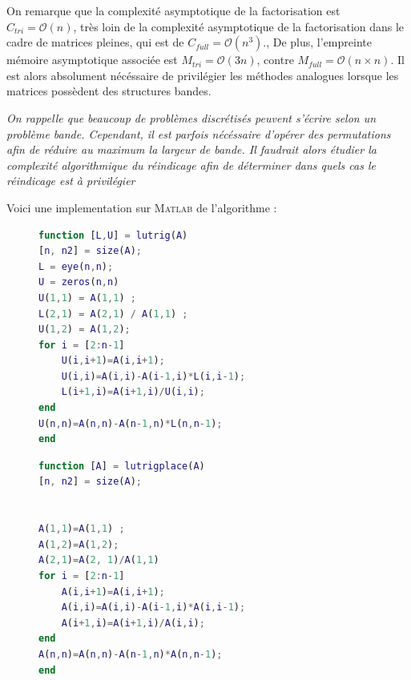 \documentclass[12pt]{report}
\begin{document}
On remarque que la complexité asymptotique de la factorisation est $C_{tri} = \mathcal{O}(n)$, très loin de la complexité asymptotique de la factorisation dans le cadre de matrices pleines, qui est de $C_{full} = \mathcal{O}(n^3)$., De plus, l'empreinte mémoire asymptotique associée est $M_{tri} = \mathcal{O}(3n)$, contre $M_{full} = \mathcal{O}(n\times n)$. Il est alors absolument nécéssaire de privilégier les méthodes analogues lorsque les matrices possèdent des structures bandes. 

\textit{On rappelle que beaucoup de problèmes discrétisés peuvent s'écrire selon un problème bande. Cependant, il est parfois nécéssaire d'opérer des permutations afin de réduire au maximum la largeur de bande. Il faudrait alors étudier la complexité algorithmique du réindicage afin de déterminer dans quels cas le réindicage est à privilégier}

Voici une implementation sur \textsc{Matlab} de l'algorithme : 


\begin{figure}[H]
\begin{minipage}{0.5\textwidth}
\begin{lstlisting}[language=Matlab, caption=Factorisation LU de matrice trigonale]
function [L,U] = lutrig(A)
[n, n2] = size(A); 
L = eye(n,n);
U = zeros(n,n)
U(1,1) = A(1,1) ; 
L(2,1) = A(2,1) / A(1,1) ;
U(1,2) = A(1,2);
for i = [2:n-1]
    U(i,i+1)=A(i,i+1);
    U(i,i)=A(i,i)-A(i-1,i)*L(i,i-1);
    L(i+1,i)=A(i+1,i)/U(i,i);
end
U(n,n)=A(n,n)-A(n-1,n)*L(n,n-1);
end
\end{lstlisting}
\end{minipage}
\begin{minipage}{0.49\textwidth}
\begin{lstlisting}[language=Matlab, caption=Factorisation LU sur place de matrice trigonale]
function [A] = lutrigplace(A)
[n, n2] = size(A); 
 
 
A(1,1)=A(1,1) ; 
A(1,2)=A(1,2);
A(2,1)=A(2, 1)/A(1,1)
for i = [2:n-1]
    A(i,i+1)=A(i,i+1);
    A(i,i)=A(i,i)-A(i-1,i)*A(i,i-1);
    A(i+1,i)=A(i+1,i)/A(i,i);
end
A(n,n)=A(n,n)-A(n-1,n)*A(n,n-1);
end
\end{lstlisting}
\end{minipage}
\end{figure}
\end{document}
